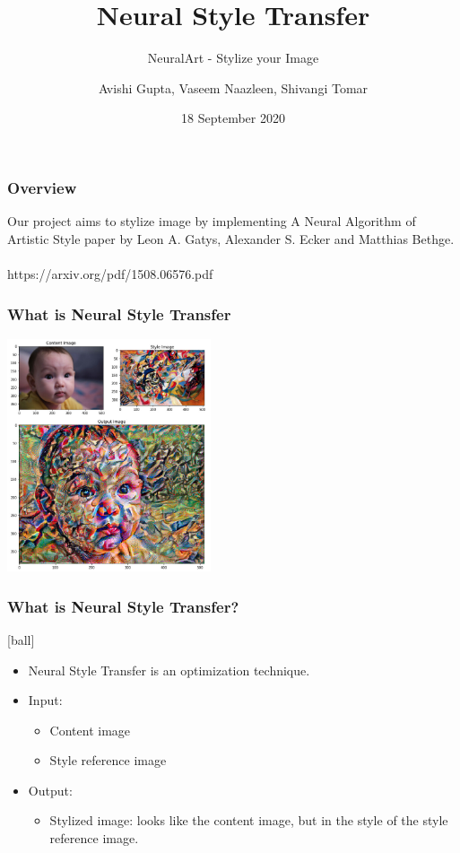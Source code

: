 \documentclass[14pt]{beamer}
\title[NST]{Neural Style Transfer}
\subtitle{NeuralArt - Stylize your Image}
\author[Team - 38]{Avishi Gupta, Vaseem Naazleen, Shivangi Tomar}
\date{18 September 2020}
\begin{document}
\begin{frame}
   \titlepage
\end{frame}

\begin{frame}
		\frametitle{Overview}
		Our project aims to stylize image by implementing A Neural Algorithm of Artistic Style paper by Leon A. Gatys, Alexander S. Ecker and Matthias Bethge. \\~\\

		https://arxiv.org/pdf/1508.06576.pdf
\end{frame}

\begin{frame}
    \frametitle{What is Neural Style Transfer}
    \begin{center}
        \includegraphics[width=60mm]{baby.jpeg}
    \end{center}
\end{frame}

\begin{frame}
		\frametitle{What is Neural Style Transfer?}
		\begin{itemize}
            \item Neural Style Transfer is an optimization technique.
           \item Input:
		\begin{itemize}
		     \item Content image
		     \item Style reference image
		\end{itemize}
             \item Output:
		\begin{itemize}
             \item Stylized image: looks like the content image, but  in the style of the style
        reference image.
        \end{itemize}
        \end{itemize}
\end{frame}
\end{document}
